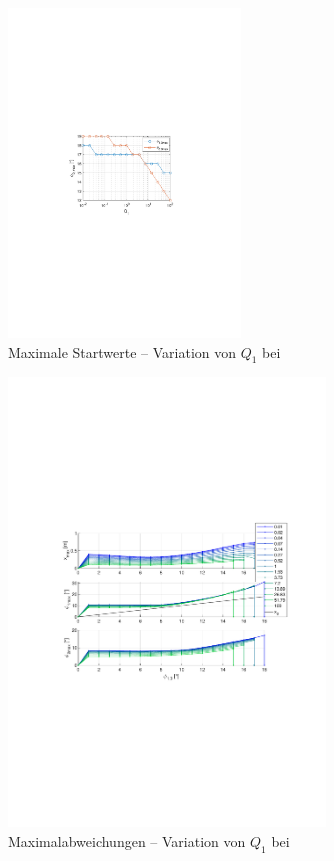 \begin{figure}[htb]
	\centering
		\includegraphics[width=0.55\textwidth]{Bilder/QRVariation/ap4/q1 phi12.pdf}
		\caption{Maximale Startwerte -- Variation von $Q_1$ bei \apv}
	\label{fig:qrap4q1}
\end{figure}

\begin{figure}[htb]
	\centering
		\includegraphics[width=0.75\textwidth]{Bilder/QRVariation/ap4/q1 phi1 m.pdf}
	\caption{Maximalabweichungen -- Variation von $Q_1$ bei \apv}
	\label{fig:qrap4q1m}
\end{figure}

